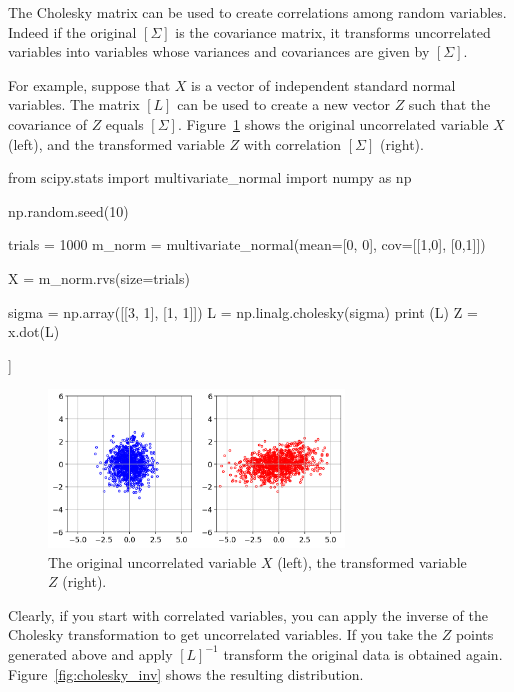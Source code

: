 The Cholesky matrix can be used to create correlations among random variables. Indeed if the original $[\Sigma]$ is the covariance matrix, it transforms uncorrelated variables into variables whose variances and covariances are given by $[\Sigma]$. 

For example, suppose that $X$ is a vector of independent standard normal variables. The matrix $[L]$ can be used to create a new vector $Z$ such that the covariance of $Z$ equals $[\Sigma]$.
Figure~\ref{fig:cholesky_norm} shows the original uncorrelated variable $X$ (left), and the transformed variable $Z$ with correlation $[\Sigma]$ (right).

\begin{ipython}
from scipy.stats import multivariate_normal
import numpy as np

np.random.seed(10)

trials = 1000
m_norm = multivariate_normal(mean=[0, 0], cov=[[1,0],
                                               [0,1]])

X = m_norm.rvs(size=trials)

sigma = np.array([[3, 1], [1, 1]])
L = np.linalg.cholesky(sigma)
print (L)
Z = x.dot(L)
\end{ipython}
\begin{ioutput}
[[1.73205081 0.        ]
 [0.57735027 0.81649658]]
\end{ioutput}

\begin{figure}[htbp]
  \centering
  \includegraphics[width=0.7\textwidth]{figures/cholesky_norm}
  \caption{The original uncorrelated variable $X$ (left), the transformed variable $Z$ (right).}
  \label{fig:cholesky_norm}
\end{figure}

Clearly, if you start with correlated variables, you can apply the inverse of the Cholesky transformation to get uncorrelated variables.
If you take the $Z$ points generated above and apply $[L]^{-1}$ transform the original data is obtained again. Figure~\ref{fig:cholesky_inv} shows the resulting distribution.

